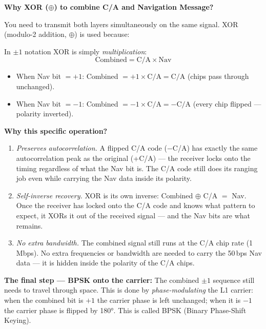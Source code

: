 \documentclass[12pt, a4paper]{article}
\begin{document}
\begin{notebox}
  \textbf{Why XOR ($\oplus$) to combine C/A and Navigation Message?}

  You need to transmit both layers simultaneously on the same signal.
  XOR (modulo-2 addition, $\oplus$) is used because:

  In $\pm 1$ notation XOR is simply \emph{multiplication}:
  \[
    \text{Combined} = \text{C/A} \times \text{Nav}
  \]
  \begin{itemize}[leftmargin=1.5em, itemsep=3pt]
    \item When Nav bit $= +1$: Combined $= +1 \times \text{C/A} = \text{C/A}$
      (chips pass through unchanged).
    \item When Nav bit $= -1$: Combined $= -1 \times \text{C/A} = -\text{C/A}$
      (every chip flipped --- polarity inverted).
  \end{itemize}

  \textbf{Why this specific operation?}
  \begin{enumerate}[leftmargin=1.5em, itemsep=3pt]
    \item \emph{Preserves autocorrelation.}
      A flipped C/A code ($-$C/A) has exactly the same autocorrelation
      peak as the original (+C/A) --- the receiver locks onto the timing
      regardless of what the Nav bit is.
      The C/A code still does its ranging job even while carrying the Nav
      data inside its polarity.
    \item \emph{Self-inverse recovery.}
      XOR is its own inverse: Combined $\oplus$ C/A $=$ Nav.
      Once the receiver has locked onto the C/A code and knows what pattern
      to expect, it XORs it out of the received signal --- and the Nav bits
      are what remains.
    \item \emph{No extra bandwidth.}
      The combined signal still runs at the C/A chip rate (1\,Mbps).
      No extra frequencies or bandwidth are needed to carry the 50\,bps
      Nav data --- it is hidden inside the polarity of the C/A chips.
  \end{enumerate}

  \textbf{The final step --- BPSK onto the carrier:}
  The combined $\pm 1$ sequence still needs to travel through space.
  This is done by \emph{phase-modulating} the L1 carrier: when the combined
  bit is $+1$ the carrier phase is left unchanged; when it is $-1$ the
  carrier phase is flipped by 180°.
  This is called BPSK (Binary Phase-Shift Keying).
\end{notebox}
\end{document}
